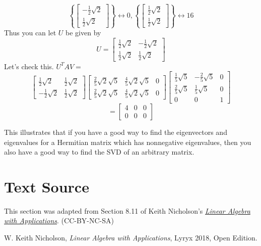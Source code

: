 \documentclass{ximera}
\begin{document}
\begin{example}
\begin{explanation}
\begin{equation*}
\left\{ \left[  
\begin{array}{c}
-\frac{1}{2}\sqrt{2} \\
\frac{1}{2}\sqrt{2}
\end{array}
\right] \right\} \leftrightarrow 0,\left\{ \left[  
\begin{array}{c}
\frac{1}{2}\sqrt{2} \\
\frac{1}{2}\sqrt{2}
\end{array}
\right] \right\} \leftrightarrow 16
\end{equation*}
Thus you can let $U$ be given by
\begin{equation*}
U=\left[  
\begin{array}{cc}
\frac{1}{2}\sqrt{2} & -\frac{1}{2}\sqrt{2} \\
\frac{1}{2}\sqrt{2} & \frac{1}{2}\sqrt{2}
\end{array}
\right]
\end{equation*}
Let's check this. $U^TAV=$
\begin{equation*}
\left[  
\begin{array}{cc}
\frac{1}{2}\sqrt{2} & \frac{1}{2}\sqrt{2} \\
-\frac{1}{2}\sqrt{2} & \frac{1}{2}\sqrt{2}
\end{array}
\right] \left[   
\begin{array}{ccc}
\frac{2}{5}\sqrt{2}\sqrt{5} & \frac{4}{5}\sqrt{2}\sqrt{5} & 0 \\
\frac{2}{5}\sqrt{2}\sqrt{5} & \frac{4}{5}\sqrt{2}\sqrt{5} & 0
\end{array}
\right] \left[ 
\begin{array}{ccc}
\frac{1}{5}\sqrt{5} & -\frac{2}{5}\sqrt{5} & 0 \\
\frac{2}{5}\sqrt{5} & \frac{1}{5}\sqrt{5} & 0 \\
0 & 0 & 1
\end{array}
\right]
\end{equation*}
\begin{equation*}
=\left[
\begin{array}{ccc}
4 & 0 & 0 \\
0 & 0 & 0
\end{array}
\right]
\end{equation*}
\end{explanation}
\end{example}

This illustrates that if you have a good way to find the eigenvectors and
eigenvalues for a Hermitian matrix which has nonnegative eigenvalues, then
you also have a good way to find the SVD of an
arbitrary matrix.



\section*{Text Source} This section was adapted from Section 8.11 of Keith Nicholson's \href{https://open.umn.edu/opentextbooks/textbooks/linear-algebra-with-applications}{\it Linear Algebra with Applications}. (CC-BY-NC-SA)

W. Keith Nicholson, {\it Linear Algebra with Applications}, Lyryx 2018, Open Edition.
\end{document}

